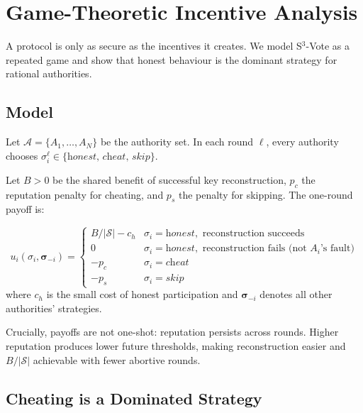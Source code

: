 \documentclass[12pt,a4paper]{article}
\theoremstyle{definition}
\theoremstyle{remark}
\begin{document}
\section{Game-Theoretic Incentive Analysis}
\label{sec:gametheory}

A protocol is only as secure as the incentives it creates.
We model S$^3$-Vote as a repeated game and show that honest behaviour
is the dominant strategy for rational authorities.

\subsection{Model}

Let $\mathcal{A} = \{A_1, \ldots, A_N\}$ be the authority set.
In each round $\ell$, every authority chooses
$\sigma_i^\ell \in \{\textit{honest},\, \textit{cheat},\, \textit{skip}\}$.

Let $B > 0$ be the shared benefit of successful key reconstruction,
$p_c$ the reputation penalty for cheating, and $p_s$ the penalty for
skipping. The one-round payoff is:

\begin{equation}
  u_i(\sigma_i, \boldsymbol{\sigma}_{-i}) =
  \begin{cases}
    B / |\mathcal{S}| - c_h
      & \sigma_i = \textit{honest}, \text{ reconstruction succeeds} \\
    0
      & \sigma_i = \textit{honest}, \text{ reconstruction fails (not } A_i\text{'s fault)} \\
    -p_c
      & \sigma_i = \textit{cheat} \\
    -p_s
      & \sigma_i = \textit{skip}
  \end{cases}
\end{equation}
where $c_h$ is the small cost of honest participation and
$\boldsymbol{\sigma}_{-i}$ denotes all other authorities' strategies.

Crucially, payoffs are not one-shot: reputation persists across rounds.
Higher reputation produces lower future thresholds, making reconstruction
easier and $B/|\mathcal{S}|$ achievable with fewer abortive rounds.

\subsection{Cheating is a Dominated Strategy}
\end{document}
